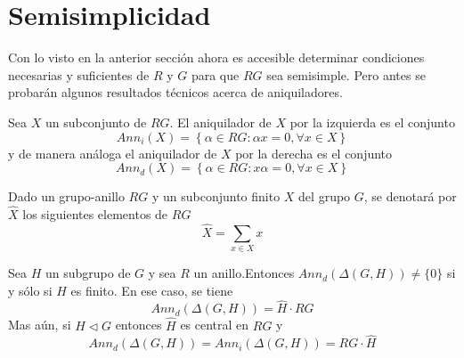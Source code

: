 
\section{Semisimplicidad}

Con lo visto en la anterior sección ahora es accesible determinar condiciones necesarias y suficientes de $R$ y $G$ para que $RG$ sea semisimple.
Pero antes se probarán algunos resultados técnicos acerca de aniquiladores. 

\begin{definicion}
Sea $X$ un subconjunto de $RG$. El aniquilador de $X$ por la izquierda es el conjunto
\[ Ann_{i}(X) = \left\{ \alpha \in RG : \alpha x = 0, \forall x \in X \right\} \]
y de manera análoga el aniquilador de $X$ por la derecha es el conjunto
\[ Ann_{d}(X) = \left\{ \alpha \in RG : x\alpha  = 0, \forall x \in X \right\} \]

\end{definicion}

\begin{definicion}
Dado un grupo-anillo $RG$ y un subconjunto finito $X$ del grupo $G$, se denotará por $\hat{X}$ los siguientes elementos de $RG$
\[\hat{X} = \sum_{x \in X}x\] 
\end{definicion}

\begin{lema}
Sea $H$ un subgrupo de $G$ y sea $R$ un anillo.Entonces $Ann_{d}(\Delta(G,H)) \neq \{ 0\}$ si y sólo si $H$ es finito. En ese caso, se tiene
$$Ann_d(\Delta(G,H)) = \hat{H} \cdot RG $$
Mas aún, si $H \lhd G$ entonces $\hat{H}$ es central en $RG$ y 
\[Ann_d(\Delta(G,H)) = Ann_i(\Delta(G,H)) = RG \cdot \hat{H}\]
\end{lema}

